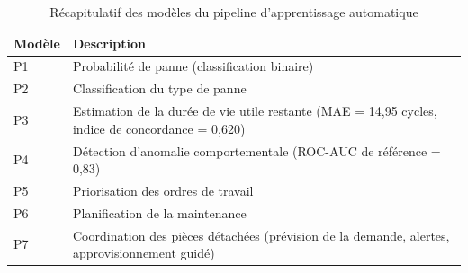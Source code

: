 \begin{table}[h]
\centering
\begin{tabularx}{\textwidth}{|l|X|}
\toprule
\textbf{Modèle} & \textbf{Description} \\
\midrule
P1 & Probabilité de panne (classification binaire) \\
\midrule
P2 & Classification du type de panne \\
\midrule
P3 & Estimation de la durée de vie utile restante (MAE = 14,95 cycles, indice de concordance = 0,620) \\
\midrule
P4 & Détection d'anomalie comportementale (ROC-AUC de référence = 0,83) \\
\midrule
P5 & Priorisation des ordres de travail \\
\midrule
P6 & Planification de la maintenance \\
\midrule
P7 & Coordination des pièces détachées (prévision de la demande, alertes, approvisionnement guidé) \\
\bottomrule
\end{tabularx}
\caption{Récapitulatif des modèles du pipeline d'apprentissage automatique}
\label{tab:metriques-completes-fr}
\end{table}

